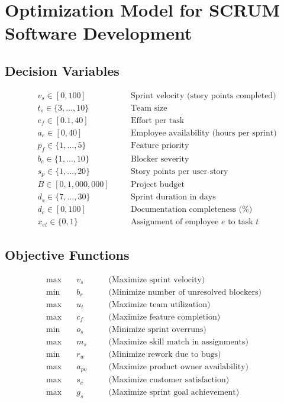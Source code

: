 \documentclass{article}
\begin{document}
\section*{Optimization Model for SCRUM Software Development}

\subsection*{Decision Variables}

\begin{align*}
& v_s \in [0, 100] \quad && \text{Sprint velocity (story points completed)} \\
& t_s \in \{3, \ldots, 10\} \quad && \text{Team size} \\
& e_f \in [0.1, 40] \quad && \text{Effort per task} \\
& a_e \in [0, 40] \quad && \text{Employee availability (hours per sprint)} \\
& p_f \in \{1, \ldots, 5\} \quad && \text{Feature priority} \\
& b_c \in \{1, \ldots, 10\} \quad && \text{Blocker severity} \\
& s_p \in \{1, \ldots, 20\} \quad && \text{Story points per user story} \\
& B \in [0, 1{,}000{,}000] \quad && \text{Project budget} \\
& d_s \in \{7, \ldots, 30\} \quad && \text{Sprint duration in days} \\
& d_c \in [0, 100] \quad && \text{Documentation completeness (\%)} \\
& x_{et} \in \{0,1\} \quad && \text{Assignment of employee $e$ to task $t$}
\end{align*}

\subsection*{Objective Functions}

\begin{align*}
\max \quad & v_s \quad && \text{(Maximize sprint velocity)} \\
\min \quad & b_r \quad && \text{(Minimize number of unresolved blockers)} \\
\max \quad & u_t \quad && \text{(Maximize team utilization)} \\
\max \quad & c_f \quad && \text{(Maximize feature completion)} \\
\min \quad & o_s \quad && \text{(Minimize sprint overruns)} \\
\max \quad & m_s \quad && \text{(Maximize skill match in assignments)} \\
\min \quad & r_w \quad && \text{(Minimize rework due to bugs)} \\
\max \quad & a_{po} \quad && \text{(Maximize product owner availability)} \\
\max \quad & s_c \quad && \text{(Maximize customer satisfaction)} \\
\max \quad & g_s \quad && \text{(Maximize sprint goal achievement)} \\
\end{align*}
\end{document}
